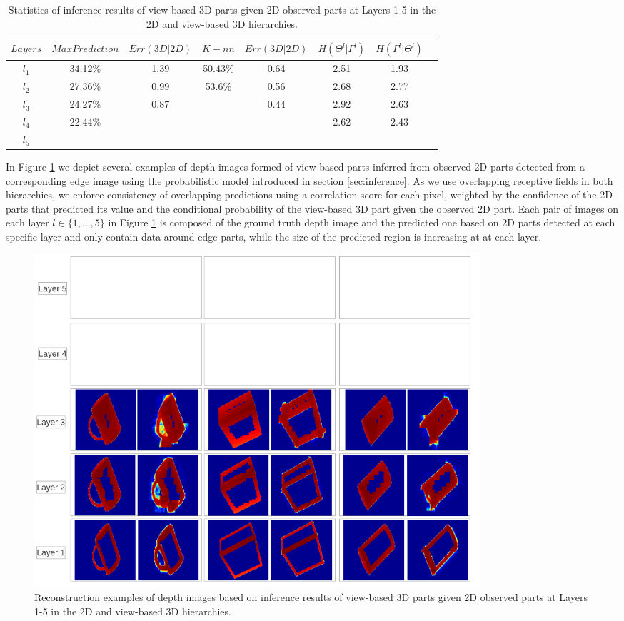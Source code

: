 \documentclass[runningheads]{llncs}
\begin{document}
 \begin{table}
 \begin{center}
  \begin{tabular}{ | c | c | c | c | c | c | c |r |}
      \hline
      $Layers$  & $Max Prediction$ & $Err(3D|2D)$ & $K-nn$ & $Err(3D|2D)$ & $H(\Theta^l|\Gamma^l)$ & $H(\Gamma^l|\Theta^l)$  \\ \hline
    $l_1$ &  34.12\% & 1.39 & 50.43\% & 0.64 & 2.51 & 1.93 \\ \hline
    $l_2$ &  27.36\% & 0.99 & 53.6\% & 0.56 & 2.68 & 2.77 \\ \hline
    $l_3$ &  24.27\% & 0.87 &  & 0.44 & 2.92 & 2.63 \\ \hline 
    $l_4$ &  22.44\% &  &  &  & 2.62 & 2.43 \\ \hline
    $l_5$ &   &  &  &  &  &  \\ 
    \hline
  \end{tabular}
\end{center}
\caption{Statistics of inference results of view-based 3D parts given 2D observed parts at Layers 1-5 in the 2D and view-based 3D hierarchies.}
\end{table}

In Figure \ref{inference} we depict several examples of depth images formed of view-based parts inferred from observed 2D parts detected from a corresponding edge image using the probabilistic model introduced in section \ref{sec:inference}. As we use overlapping receptive fields in both hierarchies, we enforce consistency of overlapping predictions using a correlation score for each pixel, weighted by the confidence of the 2D parts that predicted its value and the conditional probability of the view-based 3D part given the observed 2D part. Each pair of images on each layer $l\in\{1,\ldots,5\}$ in Figure \ref{inference} is composed of the ground truth depth image and the predicted one based on 2D parts detected at each specific layer and only contain data around edge parts, while the size of the predicted region is increasing at at each layer.

\begin{figure}
\begin{center}
\includegraphics[width=0.8\textwidth]{inference}
\end{center}
\caption{Reconstruction examples of depth images based on inference results of view-based 3D parts given 2D observed parts at Layers 1-5 in the 2D and view-based 3D hierarchies.}
\label{inference}
\end{figure}
\end{document}
